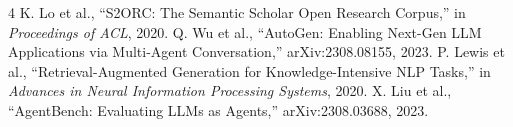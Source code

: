 \documentclass[10pt,twocolumn]{article}
\begin{document}
\newpage

\begin{thebibliography}{4}
 K. Lo et al., ``S2ORC: The Semantic Scholar Open Research Corpus,'' in \textit{Proceedings of ACL}, 2020.
 Q. Wu et al., ``AutoGen: Enabling Next-Gen LLM Applications via Multi-Agent Conversation,'' arXiv:2308.08155, 2023.
 P. Lewis et al., ``Retrieval-Augmented Generation for Knowledge-Intensive NLP Tasks,'' in \textit{Advances in Neural Information Processing Systems}, 2020.
 X. Liu et al., ``AgentBench: Evaluating LLMs as Agents,'' arXiv:2308.03688, 2023.
\end{thebibliography}
\end{document}
